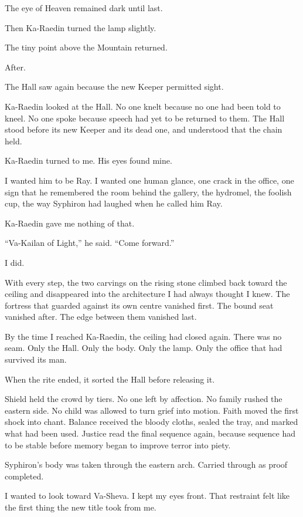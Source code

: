 The eye of Heaven remained dark until last.\par
Then Ka-Raedin turned the lamp slightly.\par
The tiny point above the Mountain returned.\par
After.\par
The Hall saw again because the new Keeper permitted sight.\par
Ka-Raedin looked at the Hall.
No one knelt because no one had been told to kneel.
No one spoke because speech had yet to be returned to them.
The Hall stood before its new Keeper and its dead one, and understood that the chain held.\par
Ka-Raedin turned to me.
His eyes found mine.\par
I wanted him to be Ray.
I wanted one human glance, one crack in the office, one sign that he remembered the room behind the gallery, the hydromel, the foolish cup, the way Syphiron had laughed when he called him Ray.\par
Ka-Raedin gave me nothing of that.\par
``Va-Kailan of Light,'' he said.
``Come forward.''\par
I did.\par
With every step, the two carvings on the rising stone climbed back toward the ceiling and disappeared into the architecture I had always thought I knew.
The fortress that guarded against its own centre vanished first.
The bound seat vanished after.
The edge between them vanished last.\par
By the time I reached Ka-Raedin, the ceiling had closed again.
There was no seam.
Only the Hall.
Only the body.
Only the lamp.
Only the office that had survived its man.\par
When the rite ended, it sorted the Hall before releasing it.\par
Shield held the crowd by tiers.
No one left by affection.
No family rushed the eastern side.
No child was allowed to turn grief into motion.
Faith moved the first shock into chant.
Balance received the bloody cloths, sealed the tray, and marked what had been used.
Justice read the final sequence again, because sequence had to be stable before memory began to improve terror into piety.\par
Syphiron's body was taken through the eastern arch.
Carried through as proof completed.\par
I wanted to look toward Va-Sheva.
I kept my eyes front.
That restraint felt like the first thing the new title took from me.\par
